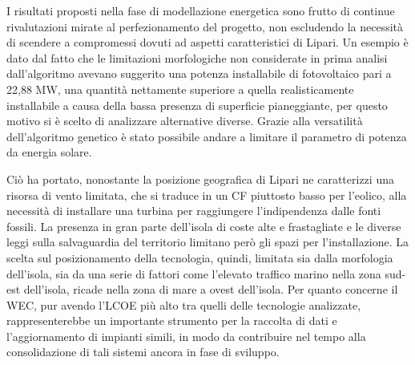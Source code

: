 \documentclass[fleqn,11pt]{SelfArx} %
\begin{document}
I risultati proposti nella fase di modellazione energetica sono frutto di continue rivalutazioni mirate al perfezionamento del progetto, non escludendo la necessità di scendere a compromessi dovuti ad aspetti caratteristici di Lipari. Un esempio è dato dal fatto che le limitazioni morfologiche non considerate in prima analisi dall'algoritmo avevano suggerito una potenza installabile di fotovoltaico pari a 22,88 MW, una quantità nettamente superiore a quella realisticamente installabile a causa della bassa presenza di superficie pianeggiante, per questo motivo si è scelto di analizzare alternative diverse. Grazie alla versatilità dell'algoritmo genetico è stato possibile andare a limitare il parametro di potenza da energia solare.

Ciò ha portato, nonostante la posizione geografica di Lipari ne caratterizzi una risorsa di vento limitata, che si traduce in un CF piuttosto basso per l'eolico, alla necessità di installare una turbina per raggiungere l'indipendenza dalle fonti fossili. La presenza in gran parte dell'isola di coste alte e frastagliate e le diverse leggi sulla salvaguardia del territorio limitano però gli spazi per l'installazione. La scelta sul posizionamento della tecnologia, quindi, limitata sia dalla morfologia dell'isola, sia da una serie di fattori come l'elevato traffico marino nella zona sud-est dell'isola, ricade nella zona di mare a ovest dell'isola. 
Per quanto concerne il WEC,  pur avendo l'LCOE più alto tra quelli delle tecnologie analizzate, rappresenterebbe un importante strumento per la raccolta di dati e l'aggiornamento di impianti simili, in modo da contribuire nel tempo alla consolidazione di tali sistemi ancora in fase di sviluppo.



\end{document}
